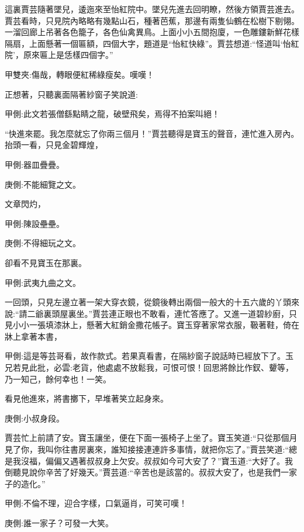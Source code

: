 \begin{parag}
    這裏賈芸隨著墜兒，逶迤來至怡紅院中。墜兒先進去回明瞭，然後方領賈芸進去。賈芸看時，只見院內略略有幾點山石，種著芭蕉，那邊有兩隻仙鶴在松樹下剔翎。一溜回廊上吊著各色籠子，各色仙禽異鳥。上面小小五間抱廈，一色雕鏤新鮮花樣隔扇，上面懸著一個匾額，四個大字，題道是“怡紅快綠”。賈芸想道:“怪道叫‘怡紅院’，原來匾上是恁樣四個字。”\begin{note}甲雙夾:傷哉，轉眼便紅稀綠瘦矣。嘆嘆！\end{note}正想著，只聽裏面隔著紗窗子笑說道:\begin{note}甲側:此文若張僧繇點睛之龍，破壁飛矣，焉得不拍案叫絕！\end{note}“快進來罷。我怎麼就忘了你兩三個月！”賈芸聽得是寶玉的聲音，連忙進入房內。抬頭一看，只見金碧輝煌，\begin{note}甲側:器皿疊疊。\end{note}\begin{note}庚側:不能細覽之文。\end{note}文章閃灼，\begin{note}甲側:陳設壘壘。\end{note}\begin{note}庚側:不得細玩之文。\end{note}卻看不見寶玉在那裏。\begin{note}甲側:武夷九曲之文。\end{note}一回頭，只見左邊立著一架大穿衣鏡，從鏡後轉出兩個一般大的十五六歲的丫頭來說:“請二爺裏頭屋裏坐。”賈芸連正眼也不敢看，連忙答應了。又進一道碧紗廚，只見小小一張填漆牀上，懸著大紅銷金撒花帳子。寶玉穿著家常衣服，靸著鞋，倚在牀上拿著本書，\begin{note}甲側:這是等芸哥看，故作款式。若果真看書，在隔紗窗子說話時已經放下了。玉兄若見此批，必雲:老貨，他處處不放鬆我，可恨可恨！回思將餘比作釵、顰等，乃一知己，餘何幸也！一笑。\end{note}看見他進來，將書擲下，早堆著笑立起身來。\begin{note}庚側:小叔身段。\end{note}賈芸忙上前請了安。寶玉讓坐，便在下面一張椅子上坐了。寶玉笑道:“只從那個月見了你，我叫你往書房裏來，誰知接接連連許多事情，就把你忘了。”賈芸笑道:“總是我沒福，偏偏又遇著叔叔身上欠安。叔叔如今可大安了？”寶玉道:“大好了。我倒聽見說你辛苦了好幾天。”賈芸道:“辛苦也是該當的。叔叔大安了，也是我們一家子的造化。”\begin{note}甲側:不倫不理，迎合字樣，口氣逼肖，可笑可嘆！\end{note}\begin{note}庚側:誰一家子？可發一大笑。\end{note}
\end{parag}


